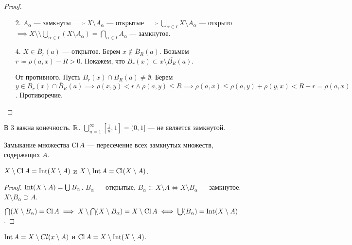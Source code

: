 \begin{proof}
    \begin{enumerate}
        \item[2.] $A_\alpha$ --- замкнуты  $\implies X \setminus A_\alpha$ --- открытые  $\implies \bigcup\limits_{\alpha \in I} X \setminus A_\alpha$ --- открыто  $\implies X \setminus \setminus \bigcup\limits_{\alpha \in I} (X \setminus A_{\alpha}) = \bigcap\limits_{\alpha \in I} A_\alpha$ --- замкнутое.
        \item[4.] $X \in \overline{B}_r(a)$ --- открытое. Берем  $x \notin \overline{B}_R(a)$. Возьмем $r \coloneqq \rho(a, x) - R > 0$. Покажем, что  $B_r(x) \subset x \setminus \overline{B_R}(a)$.

            От противного. Пусть $B_r(x) \cap \overline{B}_R(a) \neq \emptyset$. Берем  $y \in B_r(x) \cap \overline{B}_R(a) \implies \rho(x, y) < r \land \rho(a, y) \le R \implies \rho(a, x) \le \rho(a, y) + \rho(y, x) < R + r = \rho(a, x)$. Противоречие.
    \end{enumerate}
\end{proof}
\begin{remark}
    В 3 важна конечность. $\mathbb{R}$.  $\bigcup\limits_{n=1}^{\infty} [\frac{1}{n}, 1] = (0, 1]$ --- не является замкнутой.
\end{remark}
\begin{definition}
    Замыкание множества $\operatorname{Cl} A$ --- пересечение всех замкнутых множеств, содержащих  $A$.
\end{definition}
\begin{theorem}
    $X \setminus \operatorname{Cl} A = \operatorname{Int}(X \setminus A)$ и  $X \setminus \operatorname{Int} A = \operatorname{Cl}(X \setminus A)$.
\end{theorem}
\begin{proof}
    $\operatorname{Int}(X \setminus A) = \bigcup B_{\alpha}$.  $B_\alpha$ --- открытые,  $B_\alpha \subset X \setminus A \iff X \setminus B_\alpha$ --- замкнутое. $X \setminus B_\alpha \supset A$.

    $\bigcap(X \setminus B_\alpha) = \operatorname{Cl} A \implies X \setminus \bigcap (X \setminus B_\alpha) = X \setminus \operatorname{Cl} A \iff \bigcup(B_\alpha) = \operatorname{Int}(X \setminus A)$.
\end{proof}
\begin{consequence}
    $\operatorname{Int} A = X \setminus Cl(x \setminus A)$ и  $\operatorname{Cl} A = X \setminus \operatorname{Int}(X \setminus A)$.
\end{consequence}
